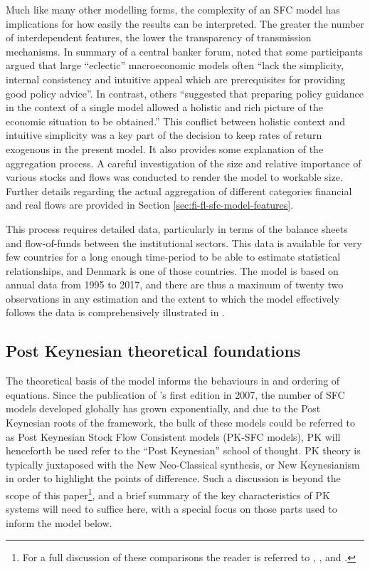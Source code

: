 \documentclass[
]{book}
\begin{document}
Much like many other modelling forms, the complexity of an SFC model has implications for how easily the results can be interpreted. The greater the number of interdependent features, the lower the transparency of transmission mechanisms. In summary of a central banker forum, \citet[pp.~25]{Pill2001} noted that some participants argued that large ``eclectic'' macroeconomic models often ``lack the simplicity, internal consistency and intuitive appeal which are prerequisites for providing good policy advice''. In contrast, others ``suggested that preparing policy guidance in the context of a single model allowed a holistic and rich picture of the economic situation to be obtained.'' This conflict between holistic context and intuitive simplicity was a key part of the decision to keep rates of return exogenous in the present model. It also provides some explanation of the aggregation process. A careful investigation of the size and relative importance of various stocks and flows was conducted to render the model to workable size. Further details regarding the actual aggregation of different categories financial and real flows are provided in Section \ref{sec:fi-fl-sfc-model-features}.

This process requires detailed data, particularly in terms of the balance sheets and flow-of-funds between the institutional sectors. This data is available for very few countries for a long enough time-period to be able to estimate statistical relationships, and Denmark is one of those countries. The model is based on annual data from 1995 to 2017, and there are thus a maximum of twenty two observations in any estimation and the extent to which the model effectively follows the data is comprehensively illustrated in \citet{byrialsenraza2019empirical}.

\hypertarget{post-keynesian-theoretical-foundations}{%
\subsection{Post Keynesian theoretical foundations}\label{post-keynesian-theoretical-foundations}}

The theoretical basis of the model informs the behaviours in and ordering of equations. Since the publication of \citet{godleylavoie2012}'s first edition in 2007, the number of SFC models developed globally has grown exponentially, and due to the Post Keynesian roots of the framework, the bulk of these models could be referred to as Post Keynesian Stock Flow Consistent models (PK-SFC models), PK will henceforth be used refer to the ``Post Keynesian'' school of thought. PK theory is typically juxtaposed with the New Neo-Classical synthesis, or New Keynesianism in order to highlight the points of difference. Such a discussion is beyond the scope of this paper\footnote{For a full discussion of these comparisons the reader is referred to \citet{dow1985}, \citet{dow2001pkm}, \citet{chickdow2001flr} and \citet{chick2003}.}, and a brief summary of the key characteristics of PK systems will need to suffice here, with a special focus on those parts used to inform the model below.
\end{document}
